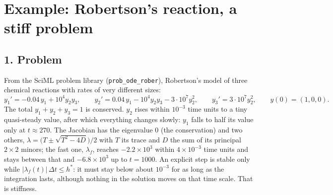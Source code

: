 \documentclass[11pt,a4paper]{article}
\begin{document}
\section*{Example: Robertson's reaction, a stiff problem}

\subsection*{1. Problem}
From the SciML problem library (\texttt{prob\_ode\_rober}), Robertson's
model of three chemical reactions with rates of very different sizes:
\begin{equation*}
  y_1' = -0.04\,y_1 + 10^4 y_2 y_3, \qquad
  y_2' = 0.04\,y_1 - 10^4 y_2 y_3 - 3\cdot10^7 y_2^2, \qquad
  y_3' = 3\cdot10^7 y_2^2, \qquad y(0) = (1, 0, 0).
\end{equation*}
The total $y_1 + y_2 + y_3 = 1$ is conserved. $y_2$ rises within
$10^{-3}$ time units to a tiny quasi-steady value, after which everything
changes slowly: $y_1$ falls to half its value only at $t \approx 270$.
The Jacobian has the eigenvalue $0$ (the conservation) and two others,
$\lambda = \bigl(T \pm \sqrt{T^2 - 4D}\bigr)/2$ with $T$ its trace and $D$
the sum of its principal $2\times2$ minors; the fast one, $\lambda_f$, reaches
$-2.2\times10^3$ within $4\times10^{-3}$ time units and stays between that and
$-6.8\times10^3$ up to $t = 1000$. An explicit step is
stable only while $|\lambda_f(t)|\,\Delta t \le h^*$: it must stay below about
$10^{-3}$ for as long as the integration lasts, although nothing in the
solution moves on that time scale. That is stiffness.
\begin{center}
\small

\end{center}

\newpage
\end{document}
